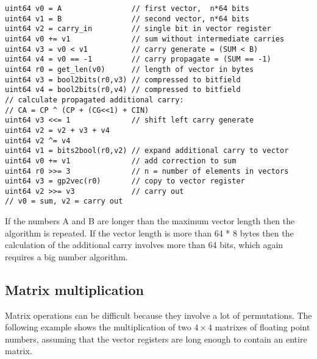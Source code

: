 \documentclass[forwardcom.tex]{subfiles}
\begin{document}
\begin{example}
\label{exampleHighPrecisionArithmetic}
\end{example}
\begin{lstlisting}[frame=single]
uint64 v0 = A                // first vector,  n*64 bits
uint64 v1 = B                // second vector, n*64 bits
uint64 v2 = carry_in         // single bit in vector register
uint64 v0 += v1              // sum without intermediate carries
uint64 v3 = v0 < v1          // carry generate = (SUM < B)
uint64 v4 = v0 == -1         // carry propagate = (SUM == -1) 
uint64 r0 = get_len(v0)      // length of vector in bytes
uint64 v3 = bool2bits(r0,v3) // compressed to bitfield
uint64 v4 = bool2bits(r0,v4) // compressed to bitfield
// calculate propagated additional carry:
// CA = CP ^ (CP + (CG<<1) + CIN)
uint64 v3 <<= 1              // shift left carry generate
uint64 v2 = v2 + v3 + v4
uint64 v2 ^= v4
uint64 v1 = bits2bool(r0,v2) // expand additional carry to vector
uint64 v0 += v1              // add correction to sum
uint64 r0 >>= 3              // n = number of elements in vectors
uint64 v3 = gp2vec(r0)       // copy to vector register
uint64 v2 >>= v3             // carry out
// v0 = sum, v2 = carry out
\end{lstlisting}
\vspace{2mm}

If the numbers A and B are longer than the maximum vector length then the algorithm is repeated. If the vector length is more than 64 * 8 bytes then the calculation of the additional carry involves more than 64 bits, which again requires a big number algorithm.

\subsection{Matrix multiplication} \label{matrixMultiplication}
Matrix operations can be difficult because they involve a lot of permutations. The following example shows the multiplication of two $4\times4$ matrixes of floating point numbers, assuming that the vector registers are long enough to contain an entire matrix.
\vspace{2mm}
\end{document}
